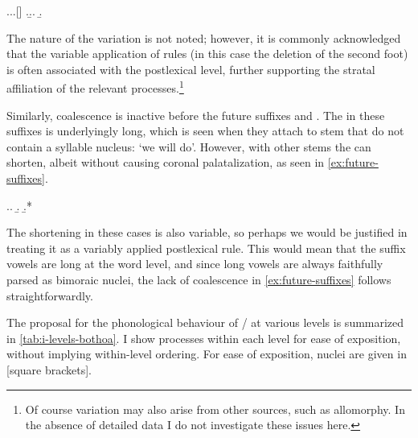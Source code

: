 \ex.\a.\a.[]
\z.\b.\a.
\b.\mbi{[ˈkontiəw]}

The nature of the variation is not noted; however, it is commonly acknowledged that the variable application of rules (in this case the deletion of the second foot) is often associated with the postlexical level, further supporting the stratal affiliation of the relevant processes.\footnote{Of course variation may also arise from other sources, such as allomorphy. In the absence of detailed data I do not investigate these issues here.}

Similarly, coalescence is inactive before the future suffixes  and . The \ipa{[iː]} in these suffixes is underlyingly long, which is seen when they attach to stem that do not contain a syllable nucleus:  `we will do'. However, with other stems the \ipa{[i]} can shorten, albeit without causing coronal palatalization, as seen in \cref{ex:future-suffixes}.

\ex.\label{ex:future-suffixes}\a.
\b.\mbi{[ˌlɛˈniːamb̥]}
\b.*

The shortening in these cases is also variable, so perhaps we would be justified in treating it as a variably applied postlexical rule. This would mean that the suffix vowels are long at the word level, and since long vowels are always faithfully parsed as bimoraic nuclei, the lack of coalescence in \cref{ex:future-suffixes} follows straightforwardly.

The proposal for the phonological behaviour of \ipa{[i]}/\ipa{[j]} at various levels is summarized in \cref{tab:i-levels-bothoa}. I show processes within each level for ease of exposition, without implying within-level ordering. For ease of exposition, nuclei are given in [square brackets].

